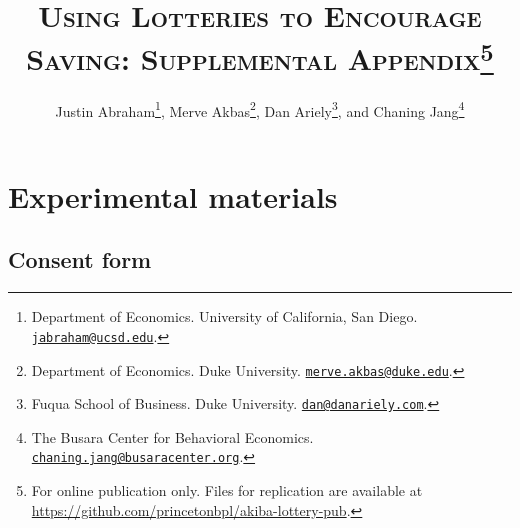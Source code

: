 \documentclass[11pt]{article}
\begin{document}
\title{\textsc{Using Lotteries to Encourage Saving: Supplemental Appendix}\protect\footnote{For online publication only. Files for replication are available at \url{https://github.com/princetonbpl/akiba-lottery-pub}.}}

\author{Justin Abraham\thanks{Department of Economics. University of California, San Diego. \protect\href{mailto:jabraham@ucsd.edu}{\nolinkurl{jabraham@ucsd.edu}}.}, Merve Akbas\thanks{Department of Economics. Duke University. \protect\href{mailto:merve.akbas@duke.edu}{\nolinkurl{merve.akbas@duke.edu}}.}, Dan Ariely\thanks{Fuqua School of Business. Duke University. \protect\href{mailto:dan@danariely.com}{\nolinkurl{dan@danariely.com}}.}, and Chaning Jang\thanks{The Busara Center for Behavioral Economics. \protect\href{mailto:chaning.jang@busaracenter.org}{\nolinkurl{chaning.jang@busaracenter.org}}.}} %

\maketitle

\newpage

\tableofcontents

\newpage

\appendix

\section{Experimental materials}

    \subsection{Consent form}
\end{document}
